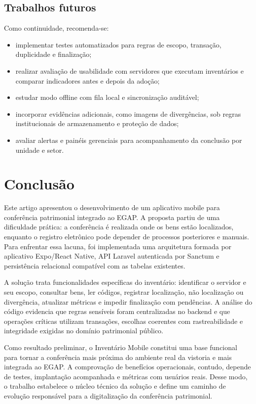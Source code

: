 \documentclass[12pt,a4paper]{article}
\begin{document}
\subsection{Trabalhos futuros}

Como continuidade, recomenda-se:

\begin{itemize}
  \item implementar testes automatizados para regras de escopo, transação,
  duplicidade e finalização;
  \item realizar avaliação de usabilidade com servidores que executam
  inventários e comparar indicadores antes e depois da adoção;
  \item estudar modo offline com fila local e sincronização auditável;
  \item incorporar evidências adicionais, como imagens de divergências, sob
  regras institucionais de armazenamento e proteção de dados;
  \item avaliar alertas e painéis gerenciais para acompanhamento da conclusão
  por unidade e setor.
\end{itemize}

\section{Conclusão}

Este artigo apresentou o desenvolvimento de um aplicativo mobile para
conferência patrimonial integrado ao EGAP. A proposta partiu de uma dificuldade
prática: a conferência é realizada onde os bens estão localizados, enquanto o
registro eletrônico pode depender de processos posteriores e manuais. Para
enfrentar essa lacuna, foi implementada uma arquitetura formada por aplicativo
Expo/React Native, API Laravel autenticada por Sanctum e persistência
relacional compatível com as tabelas existentes.

A solução trata funcionalidades específicas do inventário: identificar o
servidor e seu escopo, consultar bens, ler códigos, registrar localização, não
localização ou divergência, atualizar métricas e impedir finalização com
pendências. A análise do código evidencia que regras sensíveis foram
centralizadas no backend e que operações críticas utilizam transações, escolhas
coerentes com rastreabilidade e integridade exigidas no domínio patrimonial
público.

Como resultado preliminar, o Inventário Mobile constitui uma base funcional
para tornar a conferência mais próxima do ambiente real da vistoria e mais
integrada ao EGAP. A comprovação de benefícios operacionais, contudo, depende
de testes, implantação acompanhada e métricas com usuários reais. Desse modo,
o trabalho estabelece o núcleo técnico da solução e define um caminho de
evolução responsável para a digitalização da conferência patrimonial.
\end{document}

